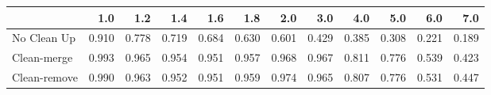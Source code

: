 \begin{tabular}{lrrrrrrrrrrr}
\toprule
{} &   1.0 &   1.2 &   1.4 &   1.6 &   1.8 &   2.0 &   3.0 &   4.0 &   5.0 &   6.0 &   7.0 \\
\midrule
No Clean Up  & 0.910 & 0.778 & 0.719 & 0.684 & 0.630 & 0.601 & 0.429 & 0.385 & 0.308 & 0.221 & 0.189 \\
Clean-merge  & 0.993 & 0.965 & 0.954 & 0.951 & 0.957 & 0.968 & 0.967 & 0.811 & 0.776 & 0.539 & 0.423 \\
Clean-remove & 0.990 & 0.963 & 0.952 & 0.951 & 0.959 & 0.974 & 0.965 & 0.807 & 0.776 & 0.531 & 0.447 \\
\bottomrule
\end{tabular}
